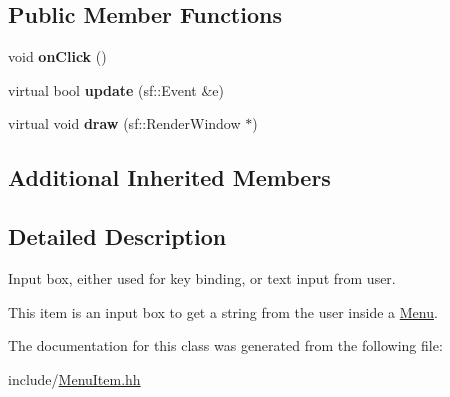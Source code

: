 \subsection*{Public Member Functions}
\begin{DoxyCompactItemize}
\item 
void {\bfseries on\+Click} ()\hypertarget{classMenuEdit_ae5466e7779bd771efc1968eeeb5fddea}{}\label{classMenuEdit_ae5466e7779bd771efc1968eeeb5fddea}

\item 
virtual bool {\bfseries update} (sf\+::\+Event \&e)\hypertarget{classMenuEdit_a3c8d2c7b9d1ed5d29b5da49691e86703}{}\label{classMenuEdit_a3c8d2c7b9d1ed5d29b5da49691e86703}

\item 
virtual void {\bfseries draw} (sf\+::\+Render\+Window $\ast$)\hypertarget{classMenuEdit_ae330da810f76873a5aa9fb1256d3033c}{}\label{classMenuEdit_ae330da810f76873a5aa9fb1256d3033c}

\end{DoxyCompactItemize}
\subsection*{Additional Inherited Members}


\subsection{Detailed Description}
Input box, either used for key binding, or text input from user. 

This item is an input box to get a string from the user inside a \hyperlink{classMenu}{Menu}. 

The documentation for this class was generated from the following file\+:\begin{DoxyCompactItemize}
\item 
include/\hyperlink{MenuItem_8hh}{Menu\+Item.\+hh}\end{DoxyCompactItemize}
